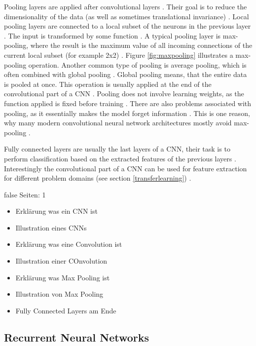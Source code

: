 \documentclass[draft,final,oneside]{vutinfth} %
\begin{document}
Pooling layers are applied after convolutional layers \cite{alexnet}. Their goal is to reduce the dimensionality of the data (as well as sometimes translational invariance) \cite{dlvc}. Local pooling layers are connected to a local subset of the neurons in the previous layer \cite{Goodfellow-et-al-2016}. The input is transformed by some function \cite{dlvc}. A typical pooling layer is max-pooling, where the result is the maximum value of all incoming connections of the current local subset (for example 2x2) \cite{alexnet}. Figure \ref{fig:maxpooling} illustrates a max-pooling operation. Another common type of pooling is average pooling, which is often combined with global pooling \cite{globalaveragepooling}. Global pooling means, that the entire data is pooled at once. This operation is usually applied at the end of the convolutional part of a CNN \cite{globalaveragepooling}. Pooling does not involve learning weights, as the function applied is fixed before training \cite{Goodfellow-et-al-2016}. There are also problems associated with pooling, as it essentially makes the model forget information \cite{resnet}. This is one reason, why many modern convolutional neural network architectures mostly avoid max-pooling \cite{resnet}.

Fully connected layers are usually the last layers of a CNN, their task is to perform classification based on the extracted features of the previous layers \cite{alexnet}. Interestingly the convolutional part of a CNN can be used for feature extraction for different problem domains (see section \ref{transferlearning}) \cite{deeplearninginneuralnetworks}.

\if false
Seiten: 1
\begin{itemize}

\item Erklärung was ein CNN ist
\item Illustration eines CNNs
\item Erklärung was eine Convolution ist
\item Illustration einer COnvolution
\item Erklärung was Max Pooling ist
\item Illustration von Max Pooling
\item Fully Connected Layers am Ende


\end{itemize}
\fi

\subsection{Recurrent Neural Networks} \label{lstmbackground}
\end{document}
